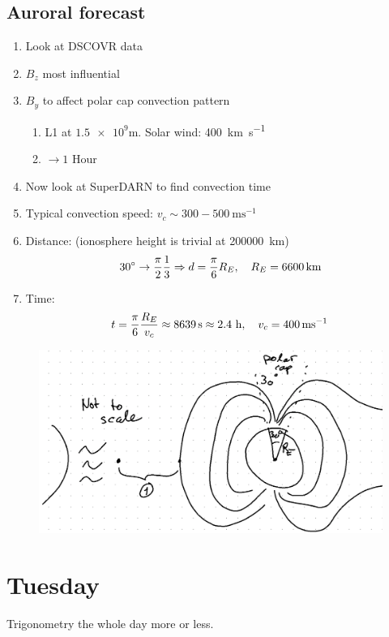 \subsection{Auroral forecast}
\begin{enumerate}[\(\bullet \)]
    \item Look at DSCOVR data
    \item \(B_z\) most influential
    \item \(B_y\) to affect polar cap convection pattern\begin{enumerate}[\(\triangleright \)]
        \item L1 at \(\num{1.5e9}\si{\metre}\). Solar wind: \SI{400}{\kilo\metre\second^{-1}}
        \item \(\rightarrow 1\) Hour
    \end{enumerate}
    \item Now look at SuperDARN to find convection time
    \item Typical convection speed: \(v_c\sim 300-\SI{500}{\metre\second^{-1}}\)
    \item Distance: (ionosphere height is trivial at \num{200000}~\si{\kilo\metre})\begin{equation*}
        30^\circ \rightarrow\frac{\pi}{2}\frac{1}{3}\Rightarrow d=\frac{\pi}{6}R_E,\quad R_E=\SI{6600}{\kilo\metre}
    \end{equation*}
    \item Time:\begin{equation*}
        t=\frac{\pi}{6}\frac{R_E}{v_c}\approx \SI{8639}{\second}\approx 2.4\textnormal{ h},\quad v_c=\SI{400}{\metre\second^{-1}}
    \end{equation*}
\end{enumerate}
\begin{figure}[ht]
    \centering
    \includegraphics[width=.7\linewidth]{bilder/L5_field_work_monday.png}
    \caption{}\label{fig:L5_field_work_monday}
\end{figure}

\section{Tuesday}
Trigonometry the whole day more or less.

